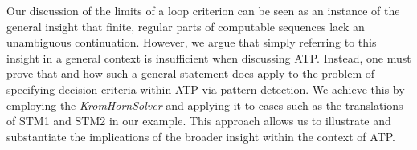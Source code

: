 \documentclass[%
  manuscript=article,   %
  year=2024,
  volume=77,
  doi=10.59203/zfn.77.694,
]{zfn}
\begin{document}
Our discussion of the limits of a loop criterion can be seen as an instance of the general insight that finite, regular parts of computable sequences lack an unambiguous continuation. However, we argue that simply referring to this insight in a general context is insufficient when discussing ATP. Instead, one must prove that and how such a general statement does apply to the problem of specifying decision criteria within ATP via pattern detection. We achieve this by employing the \emph{KromHornSolver} and applying it to cases such as the translations of STM1 and STM2 in our example. This approach allows us to illustrate and substantiate the implications of the broader insight within the context of ATP.



\printbibliography
\end{document}
